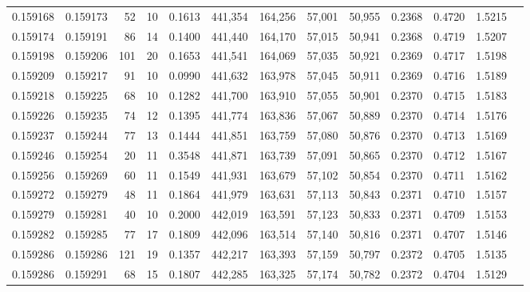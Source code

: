 \begin{tabular}{rrrrrrrrrrrrr}
0.159168 & 0.159173 &    52 &  10 &                                     0.1613 & 441,354 & 164,256 &  57,001 &  50,955 & 0.2368 & 0.4720 & 1.5215 \\
0.159174 & 0.159191 &    86 &  14 &                                     0.1400 & 441,440 & 164,170 &  57,015 &  50,941 & 0.2368 & 0.4719 & 1.5207 \\
0.159198 & 0.159206 &   101 &  20 &                                     0.1653 & 441,541 & 164,069 &  57,035 &  50,921 & 0.2369 & 0.4717 & 1.5198 \\
0.159209 & 0.159217 &    91 &  10 &                                     0.0990 & 441,632 & 163,978 &  57,045 &  50,911 & 0.2369 & 0.4716 & 1.5189 \\
0.159218 & 0.159225 &    68 &  10 &                                     0.1282 & 441,700 & 163,910 &  57,055 &  50,901 & 0.2370 & 0.4715 & 1.5183 \\
0.159226 & 0.159235 &    74 &  12 &                                     0.1395 & 441,774 & 163,836 &  57,067 &  50,889 & 0.2370 & 0.4714 & 1.5176 \\
0.159237 & 0.159244 &    77 &  13 &                                     0.1444 & 441,851 & 163,759 &  57,080 &  50,876 & 0.2370 & 0.4713 & 1.5169 \\
0.159246 & 0.159254 &    20 &  11 &                                     0.3548 & 441,871 & 163,739 &  57,091 &  50,865 & 0.2370 & 0.4712 & 1.5167 \\
0.159256 & 0.159269 &    60 &  11 &                                     0.1549 & 441,931 & 163,679 &  57,102 &  50,854 & 0.2370 & 0.4711 & 1.5162 \\
0.159272 & 0.159279 &    48 &  11 &                                     0.1864 & 441,979 & 163,631 &  57,113 &  50,843 & 0.2371 & 0.4710 & 1.5157 \\
0.159279 & 0.159281 &    40 &  10 &                                     0.2000 & 442,019 & 163,591 &  57,123 &  50,833 & 0.2371 & 0.4709 & 1.5153 \\
0.159282 & 0.159285 &    77 &  17 &                                     0.1809 & 442,096 & 163,514 &  57,140 &  50,816 & 0.2371 & 0.4707 & 1.5146 \\
0.159286 & 0.159286 &   121 &  19 &                                     0.1357 & 442,217 & 163,393 &  57,159 &  50,797 & 0.2372 & 0.4705 & 1.5135 \\
0.159286 & 0.159291 &    68 &  15 &                                     0.1807 & 442,285 & 163,325 &  57,174 &  50,782 & 0.2372 & 0.4704 & 1.5129 \\

\end{tabular}
